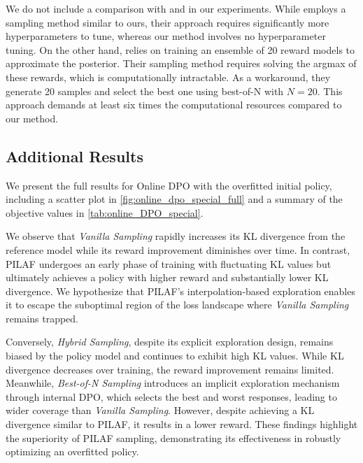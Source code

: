 We do not include a comparison with \citet{shi2024crucial} and \citet{liu2024sample} in our experiments. While \citet{shi2024crucial} employs a sampling method similar to ours, their approach requires significantly more hyperparameters to tune, whereas our method involves no hyperparameter tuning. On the other hand, \citet{liu2024sample} relies on training an ensemble of 20 reward models to approximate the posterior. Their sampling method requires solving the argmax of these rewards, which is computationally intractable. As a workaround, they generate 20 samples and select the best one using best-of-N with $N=20$. This approach demands at least six times the computational resources compared to our method.


\subsection{Additional Results}

We present the full results for Online DPO with the overfitted initial policy, including a scatter plot in \cref{fig:online_dpo_special_full} and a summary of the objective values in \cref{tab:online_DPO_special}.

We observe that \textit{Vanilla Sampling} rapidly increases its KL divergence from the reference model while its reward improvement diminishes over time. In contrast, PILAF undergoes an early phase of training with fluctuating KL values but ultimately achieves a policy with higher reward and substantially lower KL divergence. We hypothesize that PILAF’s interpolation-based exploration enables it to escape the suboptimal region of the loss landscape where \textit{Vanilla Sampling} remains trapped. 

Conversely, \textit{Hybrid Sampling}, despite its explicit exploration design, remains biased by the policy model and continues to exhibit high KL values. While KL divergence decreases over training, the reward improvement remains limited. Meanwhile, \textit{Best-of-N Sampling} introduces an implicit exploration mechanism through internal DPO, which selects the best and worst responses, leading to wider coverage than \textit{Vanilla Sampling}. However, despite achieving a KL divergence similar to PILAF, it results in a lower reward. These findings highlight the superiority of PILAF sampling, demonstrating its effectiveness in robustly optimizing an overfitted policy.





